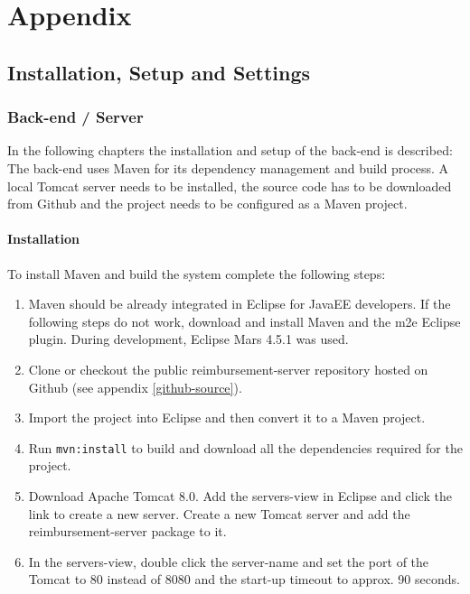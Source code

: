 \part*{Appendix}

\chapter{Installation, Setup and Settings}
\label{chap:installation}

\section{Back-end / Server}
\label{sec:backend-server}

In the following chapters the installation and setup of the back-end is described: The back-end uses Maven for its dependency management and build process. A local Tomcat server needs to be installed, the source code has to be downloaded from Github and the project needs to be configured as a Maven project.

\subsection{Installation}
To install Maven and build the system complete the following steps:

\begin{enumerate}
    \item Maven should be already integrated in Eclipse for JavaEE developers. If the following steps do not work, download and install Maven and the m2e Eclipse plugin. During development, Eclipse Mars 4.5.1 was used.
    \item Clone or checkout the public reimbursement-server repository hosted on Github (see appendix \ref{github-source}).
    \item Import the project into Eclipse and then convert it to a Maven project.
    \item Run \texttt{mvn:install} to build and download all the dependencies required for the project.
    \item Download Apache Tomcat 8.0. Add the servers-view in Eclipse and click the link to create a new server. Create a new Tomcat server and add the reimbursement-server package to it.
    \item In the servers-view, double click the server-name and set the port of the Tomcat to 80 instead of 8080 and the start-up timeout to approx. 90 seconds.
\end{enumerate}

